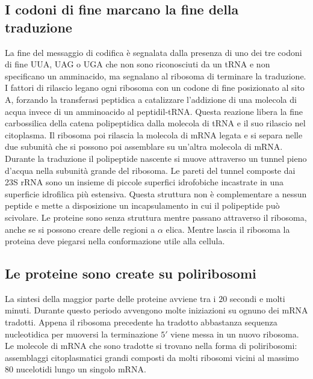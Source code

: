\subsection{I codoni di fine marcano la fine della traduzione}
La fine del messaggio di codifica \`e segnalata dalla presenza di uno dei tre codoni di fine UUA, UAG o UGA che non sono riconosciuti da un tRNA e non specificano un amminacido, ma 
segnalano al ribosoma di terminare la traduzione. I fattori di rilascio legano ogni ribosoma con un codone di fine posizionato al sito A, forzando la transferasi peptidica a catalizzare
l'addizione di una molecola di acqua invece di un amminoacido al peptidil-tRNA. Questa reazione libera la fine carbossilica della catena polipeptidica dalla molecola di tRNA e il suo
rilascio nel citoplasma. Il ribosoma poi rilascia la molecola di mRNA legata e si separa nelle due subunit\`a che si possono poi assemblare su un'altra molecola di mRNA. Durante la
traduzione il polipeptide nascente si muove attraverso un tunnel pieno d'acqua nella subunit\`a grande del ribosoma. Le pareti del tunnel composte dai 23S rRNA sono un insieme di 
piccole superfici idrofobiche incastrate in una superficie idrofilica pi\`u estensiva. Questa struttura non \`e complementare a nessun peptide  e mette a disposizione un incapsulamento
in cui il polipeptide pu\`o scivolare. Le proteine sono senza struttura mentre passano attraverso il ribosoma, anche se si possono creare delle regioni a $\alpha$ elica. Mentre lascia il
ribosoma la proteina deve piegarsi nella conformazione utile alla cellula. 
\subsection{Le proteine sono create su poliribosomi}
La sintesi della maggior parte delle proteine avviene tra i $20$ secondi e molti minuti. Durante questo periodo avvengono molte iniziazioni su ognuno dei mRNA tradotti. Appena il 
ribosoma precedente ha tradotto abbastanza sequenza nucleotidica per muoversi la terminazione $5'$ viene messa in un nuovo ribosoma. Le molecole di mRNA che sono tradotte si trovano 
nella forma di poliribosomi: assemblaggi citoplasmatici grandi composti da molti ribosomi vicini al massimo $80$ nucelotidi lungo un singolo mRNA. 
